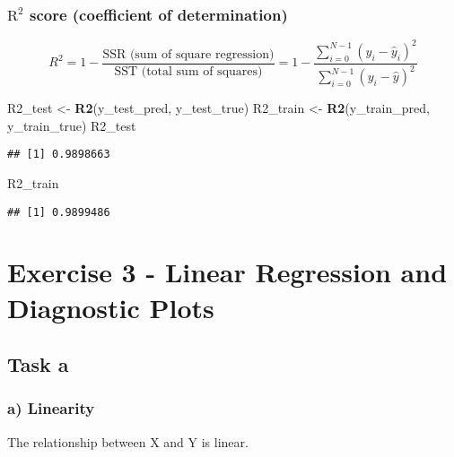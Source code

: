 \documentclass[
]{article}
\newenvironment{Shaded}{\begin{snugshade}}{\end{snugshade}}
\newcommand{\FunctionTok}[1]{\textcolor[rgb]{0.13,0.29,0.53}{\textbf{#1}}}
\newcommand{\NormalTok}[1]{#1}
\newcommand{\OtherTok}[1]{\textcolor[rgb]{0.56,0.35,0.01}{#1}}
\begin{document}
\subsubsection{\texorpdfstring{\(\text{R}^{2}\) score (coefficient of
determination)}{\textbackslash text\{R\}\^{}\{2\} score (coefficient of determination)}}\label{textr2-score-coefficient-of-determination}

\[ 
R^2 = 1 - \frac{\text{SSR (sum of square regression)}}{\text{SST (total sum of squares)}} 
= 1 - \frac{\sum_{i=0}^{N - 1} (y_i - \hat{y}_i)^2}{\sum_{i=0}^{N - 1} (y_i - \hat{y})^2}
\]

\begin{Shaded}
\begin{Highlighting}[]
\NormalTok{R2\_test }\OtherTok{\textless{}{-}} \FunctionTok{R2}\NormalTok{(y\_test\_pred, y\_test\_true)}
\NormalTok{R2\_train }\OtherTok{\textless{}{-}} \FunctionTok{R2}\NormalTok{(y\_train\_pred, y\_train\_true)}
\NormalTok{R2\_test}
\end{Highlighting}
\end{Shaded}

\begin{verbatim}
## [1] 0.9898663
\end{verbatim}

\begin{Shaded}
\begin{Highlighting}[]
\NormalTok{R2\_train}
\end{Highlighting}
\end{Shaded}

\begin{verbatim}
## [1] 0.9899486
\end{verbatim}

\section{Exercise 3 - Linear Regression and Diagnostic
Plots}\label{exercise-3---linear-regression-and-diagnostic-plots}

\subsection{Task a}\label{task-a-2}

\subsubsection{a) Linearity}\label{a-linearity}

The relationship between X and Y is linear.
\end{document}
